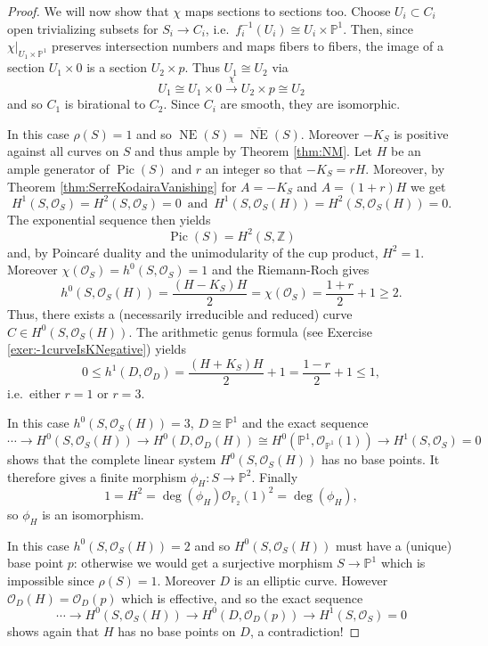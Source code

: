 \documentclass[a4paper,11pt]{amsart}
\def\dim{\operatorname{dim}}
\def\deg{\operatorname{deg}}
\def\NE{\operatorname{NE}}
\def\NEb{\overline{\operatorname{NE}}}
\def\Pic{\operatorname{Pic}}
\newcommand{\OO}{\mathcal{O}}
\newcommand{\ZZ}{\mathbb{Z}}
\newcommand{\PP}{\mathbb{P}}
\newcommand{\isom}{\cong}
\begin{document}
\begin{proof}
	We will now show that $\chi$ maps sections to sections too.
	Choose $U_i \subset C_i$ open trivializing subsets for $S_i \to C_i$, i.e.\ $f_i^{-1}(U_i) \isom U_i \times \PP^1$. 
	Then, since $\chi|_{U_1\times \PP^1}$ preserves intersection numbers and maps fibers to fibers, the image of a section $U_1 \times 0$ is a section $U_2 \times p$.
	Thus $U_1 \isom U_2$ via
	\[
	U_1 \isom U_1 \times 0 \overset{\chi}{\longrightarrow} U_2 \times p \isom U_2
	\]
	and so $C_1$ is birational to $C_2$.
	Since $C_i$ are smooth, they are isomorphic.	
	
	\noindent\fbox{Case: $\dim(B) = 0$}
	
	In this case $\rho(S) = 1$ and so $\NE(S) = \NEb(S)$.
	Moreover $-K_S$ is positive against all curves on $S$ and thus ample by Theorem \ref{thm:NM}.
	Let $H$ be an ample generator of $\Pic(S)$ and $r$ an integer so that $-K_S = rH$.
	Moreover, by Theorem \ref{thm:SerreKodairaVanishing} for $A = -K_S$ and $A = (1+r)H$ we get
	\[
	H^1(S,\OO_S) = H^2(S,\OO_S) = 0 \, \text{ and } \, H^1(S,\OO_S(H)) = H^2(S,\OO_S(H)) = 0.
	\]
	The exponential sequence then yields
	\[
	\Pic(S) = H^2(S,\ZZ)
	\]
	and, by Poincar{\'e} duality and the unimodularity of the cup product, $H^2 = 1$.
	Moreover $\chi(\OO_S) = h^0(S,\OO_S) = 1$ and the Riemann-Roch gives
	\[
	h^0(S,\OO_S(H)) = \frac{(H-K_S)H}{2} = \chi(\OO_S) = \frac{1+r}{2} + 1 \geq 2.
	\]
	Thus, there exists a (necessarily irreducible and reduced) curve $C \in H^0(S,\OO_S(H))$.
	The arithmetic genus formula (see Exercise \ref{exer:-1curveIsKNegative}) yields
	\[
	0 \leq h^1(D,\OO_D) = \frac{(H+K_S)H}{2} + 1 = \frac{1-r}{2} + 1 \leq 1,
	\]
	i.e.\ either $r = 1$ or $r = 3$.
	
	\noindent{}\label{subcase:index3}
	In this case $h^0(S,\OO_S(H)) =3$, $D\isom \PP^1$ and the exact sequence
	\[
	\cdots \to H^0(S,\OO_S(H)) \to H^0(D,\OO_D(H)) \isom H^0(\PP^1,\OO_{\PP^1}(1)) \to H^1(S,\OO_S) = 0
	\]
	shows that the complete linear system $H^0(S,\OO_S(H))$ has no base points.
	It therefore gives a finite morphism $\phi_H\colon S \to \PP^2$. Finally
	\[
	1 = H^2 = \deg(\phi_H)\OO_{\PP_2}(1)^2 = \deg(\phi_H),
	\]
	so $\phi_H$ is an isomorphism.
	
	\noindent{}
	In this case $h^0(S,\OO_S(H)) =2$ and so $H^0(S,\OO_S(H))$ must have a (unique) base point $p$:
	otherwise we would get a surjective morphism $S \to \PP^1$ which is impossible since $\rho(S) = 1$.	
	Moreover $D$ is an elliptic curve.
	However $\OO_D(H) = \OO_D(p)$ which is effective, and so the exact sequence
	\[
	\cdots \to H^0(S,\OO_S(H)) \to H^0(D,\OO_D(p)) \to H^1(S,\OO_S) = 0
	\]
	shows again that $H$ has no base points on $D$, a contradiction!
	

\end{proof}
\end{document}
